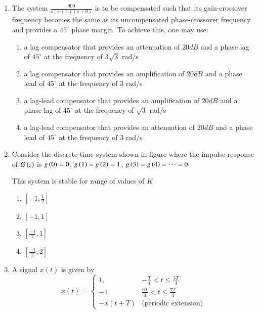 \documentclass[journal]{IEEEtran}
\begin{document}
\begin{enumerate}
\item The system $\frac{900}{s(s + 1)(s + 9)}$ is to be compensated such that its gain-crossover frequency becomes the same as its uncompensated phase-crossover frequency and provides a $45^\circ$ phase margin. To achieve this, one may use:
\begin{enumerate}
    \item a lag compensator that provides an attenuation of $20dB$ and a phase lag of $45^\circ$ at the frequency of $3\sqrt{3}$ rad/s
    \item  a lag compensator that provides an amplification of $20dB$ and a phase lead of $45^\circ$ at the frequency of $3$ rad/s
    \item  a lag-lead compensator that provides an amplification of $20dB$ and a phase lag of $45^\circ$ at the frequency of $\sqrt{3}$ rad/s
    \item  a lag-lead compensator that provides an attenuation of $20dB$ and a phase lead of $45^\circ$ at the frequency of $3$ rad/s
\end{enumerate}
\item Consider the discrete-time system shown in figure where the impulse response of $G\left(z\right)$ is $g\left(0\right)=0$, $g\left(1\right)=g\left(2\right)=1$,  $g\left(3\right)=g\left(4\right)=\cdots=0$
    

This system is stable for range of values of $K$
\begin{multicols}{2}
\begin{enumerate}
    \item $[-1,\frac{1}{2}]$
    \item $[-1,1]$
    \item $[\frac{-1}{2},1]$
    \item $[\frac{-1}{2},2]$
\end{enumerate}
\end{multicols}
\item A signal \(x(t)\) is given by
\[
x(t) =
\begin{cases}
1, & -\frac{T}{4} < t \leq \frac{3T}{4} \\
-1, & \frac{3T}{4} < t \leq \frac{7T}{4} \\
-x(t + T) & \text{(periodic extension)}
\end{cases}
\]


\end{enumerate}
\end{document}
